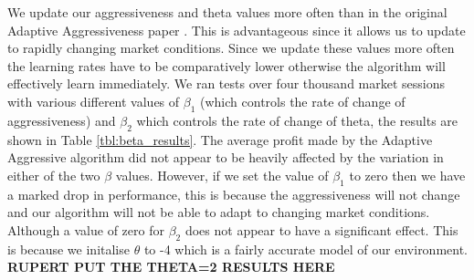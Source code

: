 \documentclass[preprint]{acm_proc_article-sp} %
\begin{document}
We update our aggressiveness and theta values more often than in the original
Adaptive Aggressiveness paper \cite{AA_thesis}. This is advantageous since it
allows us to update to rapidly changing market conditions. Since we update
these values more often the learning rates have to be comparatively lower
otherwise the algorithm will effectively learn immediately. We ran tests over
four thousand market sessions with various different values of $\beta_1$ (which
controls the rate of change of aggressiveness) and $\beta_2$ which controls the
rate of change of theta, the results are shown in Table \ref{tbl:beta_results}.
The average profit made by the Adaptive Aggressive algorithm did not appear to
be heavily affected by the variation in either of the two $\beta$ values.
However, if we set the value of $\beta_1$ to zero then we have a marked drop in
performance, this is because the aggressiveness will not change and our
algorithm will not be able to adapt to changing market conditions. Although a
value of zero for $\beta_2$ does not appear to have a significant effect. This
is because we initalise $\theta$ to -4 which is a fairly accurate model of our
environment. \textbf{RUPERT PUT THE THETA=2 RESULTS HERE}
\end{document}
